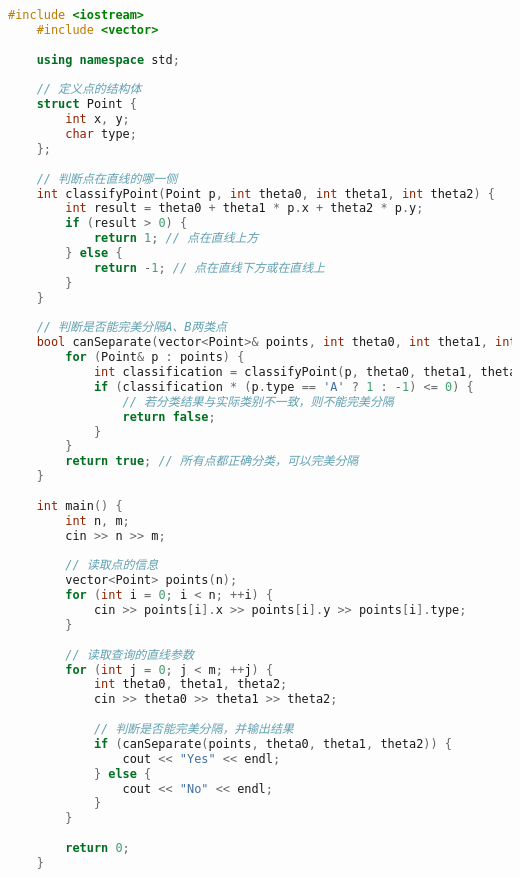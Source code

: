 \begin{lstlisting}[language=C++]
    #include <iostream>
    #include <vector>
    
    using namespace std;
    
    // 定义点的结构体
    struct Point {
        int x, y;
        char type;
    };
    
    // 判断点在直线的哪一侧
    int classifyPoint(Point p, int theta0, int theta1, int theta2) {
        int result = theta0 + theta1 * p.x + theta2 * p.y;
        if (result > 0) {
            return 1; // 点在直线上方
        } else {
            return -1; // 点在直线下方或在直线上
        }
    }
    
    // 判断是否能完美分隔A、B两类点
    bool canSeparate(vector<Point>& points, int theta0, int theta1, int theta2) {
        for (Point& p : points) {
            int classification = classifyPoint(p, theta0, theta1, theta2);
            if (classification * (p.type == 'A' ? 1 : -1) <= 0) {
                // 若分类结果与实际类别不一致，则不能完美分隔
                return false;
            }
        }
        return true; // 所有点都正确分类，可以完美分隔
    }
    
    int main() {
        int n, m;
        cin >> n >> m;
    
        // 读取点的信息
        vector<Point> points(n);
        for (int i = 0; i < n; ++i) {
            cin >> points[i].x >> points[i].y >> points[i].type;
        }
    
        // 读取查询的直线参数
        for (int j = 0; j < m; ++j) {
            int theta0, theta1, theta2;
            cin >> theta0 >> theta1 >> theta2;
    
            // 判断是否能完美分隔，并输出结果
            if (canSeparate(points, theta0, theta1, theta2)) {
                cout << "Yes" << endl;
            } else {
                cout << "No" << endl;
            }
        }
    
        return 0;
    }    
\end{lstlisting}